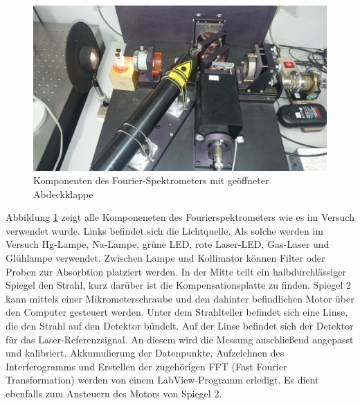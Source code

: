 	\begin{figure}[htb]
		\centering
		\includegraphics[scale = 0.08]{images/DSC_1010.JPG}
		\caption{Komponenten des Fourier-Spektrometers mit geöffneter Abdeckklappe}
		\label{fig:aufbau-mif-2}
	\end{figure}

	Abbildung \ref{fig:aufbau-mif-2} zeigt alle Komponeneten des Fourierspektrometers wie es im Versuch verwendet wurde.
	Links befindet sich die Lichtquelle.
	Als solche werden im Versuch Hg-Lampe, Na-Lampe, grüne LED, rote Laser-LED, Gas-Laser und Glühlampe verwendet.
	Zwischen Lampe und Kollimator können Filter oder Proben zur Absorbtion platziert werden.
	In der Mitte teilt ein halbdurchlässiger Spiegel den Strahl, kurz darüber ist die Kompensationsplatte zu finden.
	Spiegel 2 kann mittels einer Mikrometerschraube und den dahinter befindlichen Motor über den Computer gesteuert werden.
	Unter dem Strahlteiler befindet sich eine Linse, die den Strahl auf den Detektor bündelt.
	Auf der Linse befindet sich der Detektor für das Laser-Referenzsignal.
	An diesem wird die Messung anschließend angepasst und kalibriert.
	Akkumulierung der Datenpunkte, Aufzeichnen des Interferogramms und Erstellen der zugehörigen FFT (Fast Fourier Transformation) werden von einem LabView-Programm erledigt.
	Es dient ebenfalls zum Ansteuern des Motors von Spiegel 2.



